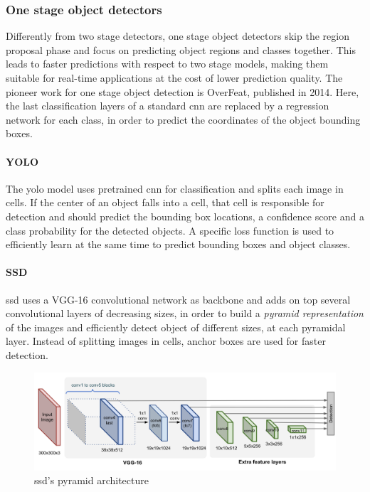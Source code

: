 \documentclass[%
    corpo=12pt,
    twoside,
    stile=classica,   
    tipotesi=magistrale,
    evenboxes,
    english,
	numerazioneromana,
]{toptesi}
\begin{document}
\subsubsection{One stage object detectors}
Differently from two stage detectors, one stage object detectors skip the region proposal phase and focus on predicting object regions and classes together. This leads to faster predictions with respect to two stage models, making them suitable for real-time applications at the cost of lower prediction quality. The pioneer work for one stage object detection is OverFeat\cite{sermanet2014overfeat}, published in 2014. Here, the last classification layers of a standard \gls{cnn} are replaced by a regression network for each class, in order to predict the coordinates of the object bounding boxes.

\paragraph{YOLO}\label{sec:yolo}
The \gls{yolo} model\cite{redmon2016look} uses pretrained \gls{cnn} for classification and splits each image in cells. If the center of an object falls into a cell, that cell is responsible for detection and should predict the bounding box locations, a confidence score and a class probability for the detected objects. A specific loss function is used to efficiently learn at the same time to predict bounding boxes and object classes.

\paragraph{SSD}
\gls{ssd}\cite{Liu_2016} uses a VGG-16 convolutional network as backbone and adds on top several convolutional layers of decreasing sizes, in order to build a \textit{pyramid representation} of the images and efficiently detect object of different sizes, at each pyramidal layer. Instead of splitting images in cells, anchor boxes are used for faster detection.

\begin{figure}[ht]
	\centering
	\includegraphics[width=.9\linewidth]{imgs/SSD-architecture.png}
	\caption{\acrshort{ssd}'s pyramid architecture\cite{objdetpart4}}
	\label{fig:ssd}
\end{figure}
\end{document}

